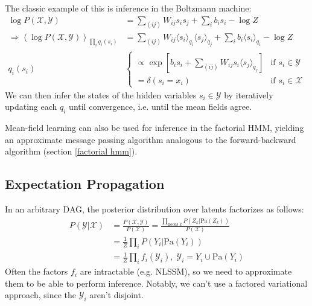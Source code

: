 \documentclass[a4paper]{article}
\begin{document}
The classic example of this is inference in the Boltzmann machine:
\begin{align*}
\log P(\mathcal{X,Y}) &= \sum_{(ij)} W_{ij}s_is_j + \sum_i b_i s_i - \log Z \\
\Rightarrow \left\langle\log P(\mathcal{X,Y})\right\rangle_{\prod_i q_i(s_i)} &= \sum_{(ij)} W_{ij}\langle s_i\rangle_{q_i} \langle s_j\rangle_{q_j} + \sum_i b_i \langle s_i\rangle_{q_i} - \log Z \\
q_i(s_i) &
\begin{cases} 
\propto \exp\left[ b_i s_i + \sum_{(ij)} W_{ij}s_i\langle s_j\rangle_{q_j}\right] & \text{if }s_i\in\mathcal{Y} \\
= \delta(s_i = x_i) & \text{if }s_i\in\mathcal{X}
\end{cases}
\end{align*}
We can then infer the states of the hidden variables $s_i\in\mathcal{Y}$ by iteratively updating each $q_i$ until convergence, i.e. until the mean fields agree.

Mean-field learning can also be used for inference in the factorial HMM, yielding an approximate message passing algorithm analogous to the forward-backward algorithm (section \ref{factorial hmm}).

\subsection{Expectation Propagation} \label{EP}
In an arbitrary DAG, the posterior distribution over latents factorizes as follows:
\begin{align*}
P(\mathcal{Y}|\mathcal{X}) &= \frac{P(\mathcal{X,Y})}{P(\mathcal{X})} = \frac{\prod_{\text{nodes } k} P(Z_k|\textrm{Pa}(Z_k))}{P(\mathcal{X})} \\
&= \frac{1}{Z} \prod_i P(Y_i|\textrm{Pa}(Y_i)) \\
&= \frac{1}{Z} \prod_i f_i(\mathcal{Y}_i), \; \mathcal{Y}_i = Y_i \cup \textrm{Pa}(Y_i)
\end{align*}
Often the factors $f_i$ are intractable (e.g. NLSSM), so we need to approximate them to be able to perform inference. Notably, we can't use a factored variational approach, since the $\mathcal{Y}_i$ aren't disjoint. 
\end{document}
